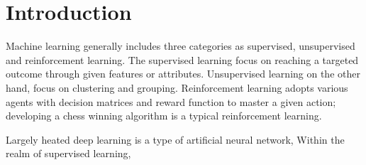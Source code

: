 \section{Introduction}

Machine learning generally includes three categories as supervised, unsupervised and reinforcement learning. The supervised learning focus on reaching a targeted outcome through given features or attributes. Unsupervised learning on the other hand, focus on clustering and grouping. Reinforcement learning adopts various agents with decision matrices and reward function to master a given action; developing a chess winning algorithm is a typical reinforcement learning.
\par
Largely heated deep learning is a type of artificial neural network, Within the realm of supervised learning, 
